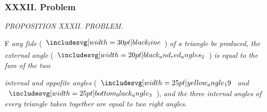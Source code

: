 \documentclass[12pt,preview]{standalone}
\begin{document}
\subsubsection{XXXII. Problem}

\begin{minipage}[t]{0.64\textwidth}
    \vspace{0pt}

    \begin{center}
        \textit{PROPOSITION XXXII. PROBLEM.}\label{book1pr32} \\
    \end{center}

    \hfill

    \begin{center}
        \raggedright \lettrine[lines=4, loversize=1, nindent=0pt]{}{}F \textit{any ſide} (\hspace{-1ex}$\blackline$\hspace{-1ex}) \textit{of a triangle be produced, the\\ external angle} (\hspace{-1ex}$\img[0][0][20]{black_and_red_angles_2}$\hspace{-1ex}) \textit{is equal to the ſum of the two}\\
    \end{center}
    \raggedright  \textit{internal and oppoſite angles} (\hspace{-1ex}$\img{yellow_angle_19}$ \textit{and} $\img{bottom_black_angle_3}$\hspace{-1ex}), \textit{and the three internal angles of every triangle taken together are equal to two right angles}.

    \hfill

    \hfill


\end{minipage}
\end{document}
